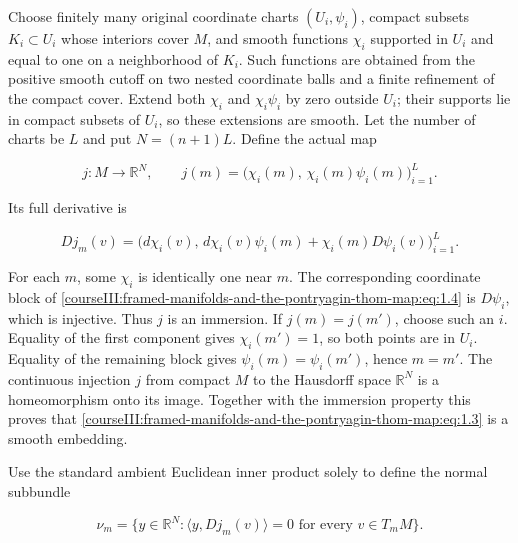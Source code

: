 \label{courseIII:pontryagin-thom:1}

Choose finitely many original coordinate charts \((U_i,\psi_i)\), compact subsets \(K_i\subset U_i\) whose interiors cover \(M\), and smooth functions \(\chi_i\) supported in \(U_i\) and equal to one on a neighborhood of \(K_i\). Such functions are obtained from the positive smooth cutoff on two nested coordinate balls and a finite refinement of the compact cover. Extend both \(\chi_i\) and \(\chi_i\psi_i\) by zero outside \(U_i\); their supports lie in compact subsets of \(U_i\), so these extensions are smooth. Let the number of charts be \(L\) and put \(N=(n+1)L\). Define the actual map

\begin{equation}
j:M\longrightarrow\mathbb R^N,\qquad
 j(m)=\bigl(\chi_i(m),\,\chi_i(m)\psi_i(m)\bigr)_{i=1}^{L}.
 \label{courseIII:framed-manifolds-and-the-pontryagin-thom-map:eq:1.3}
\end{equation}

Its full derivative is

\begin{equation}
Dj_m(v)=
 \bigl(d\chi_i(v),\,
       d\chi_i(v)\psi_i(m)+\chi_i(m)D\psi_i(v)\bigr)_{i=1}^{L}.
 \label{courseIII:framed-manifolds-and-the-pontryagin-thom-map:eq:1.4}
\end{equation}

For each \(m\), some \(\chi_i\) is identically one near \(m\). The corresponding coordinate block of \eqref{courseIII:framed-manifolds-and-the-pontryagin-thom-map:eq:1.4} is \(D\psi_i\), which is injective. Thus \(j\) is an immersion. If \(j(m)=j(m')\), choose such an \(i\). Equality of the first component gives \(\chi_i(m')=1\), so both points are in \(U_i\). Equality of the remaining block gives \(\psi_i(m)=\psi_i(m')\), hence \(m=m'\). The continuous injection \(j\) from compact \(M\) to the Hausdorff space \(\mathbb R^N\) is a homeomorphism onto its image. Together with the immersion property this proves that \eqref{courseIII:framed-manifolds-and-the-pontryagin-thom-map:eq:1.3} is a smooth embedding.

Use the standard ambient Euclidean inner product solely to define the normal subbundle

\begin{equation}
\nu_m=\{y\in\mathbb R^N:\langle y,Dj_m(v)\rangle=0
                                  \text{ for every }v\in T_mM\}.
 \label{courseIII:framed-manifolds-and-the-pontryagin-thom-map:eq:1.5}
\end{equation}

